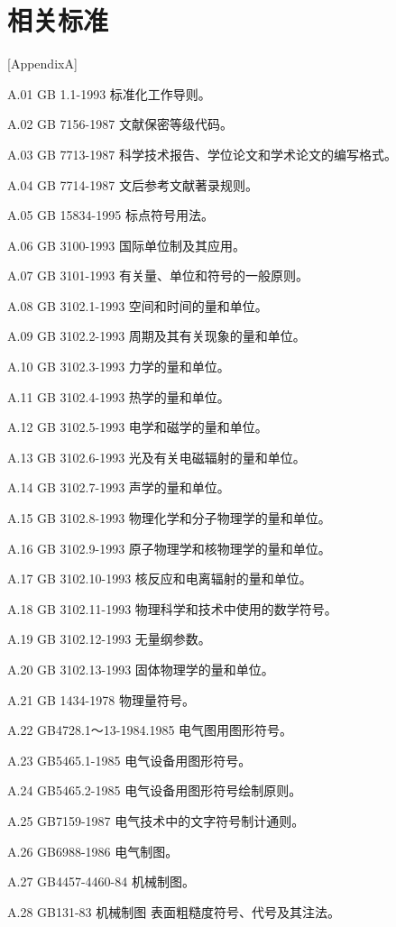 \chapter{相关标准}[AppendixA]%

A.01 GB 1.1-1993 标准化工作导则。

A.02 GB 7156-1987 文献保密等级代码。

A.03 GB 7713-1987 科学技术报告、学位论文和学术论文的编写格式。

A.04 GB 7714-1987 文后参考文献著录规则。

A.05 GB 15834-1995 标点符号用法。

A.06 GB 3100-1993 国际单位制及其应用。

A.07 GB 3101-1993 有关量、单位和符号的一般原则。

A.08 GB 3102.1-1993 空间和时间的量和单位。

A.09 GB 3102.2-1993 周期及其有关现象的量和单位。

A.10 GB 3102.3-1993 力学的量和单位。

A.11 GB 3102.4-1993 热学的量和单位。

A.12 GB 3102.5-1993 电学和磁学的量和单位。

A.13 GB 3102.6-1993 光及有关电磁辐射的量和单位。

A.14 GB 3102.7-1993 声学的量和单位。

A.15 GB 3102.8-1993 物理化学和分子物理学的量和单位。

A.16 GB 3102.9-1993 原子物理学和核物理学的量和单位。

A.17 GB 3102.10-1993 核反应和电离辐射的量和单位。

A.18 GB 3102.11-1993 物理科学和技术中使用的数学符号。

A.19 GB 3102.12-1993 无量纲参数。

A.20 GB 3102.13-1993 固体物理学的量和单位。

A.21 GB 1434-1978 物理量符号。

A.22 GB4728.1～13-1984.1985 电气图用图形符号。

A.23 GB5465.1-1985 电气设备用图形符号。

A.24 GB5465.2-1985 电气设备用图形符号绘制原则。

A.25 GB7159-1987 电气技术中的文字符号制计通则。

A.26 GB6988-1986 电气制图。

A.27 GB4457-4460-84 机械制图。

A.28 GB131-83 机械制图 表面粗糙度符号、代号及其注法。



